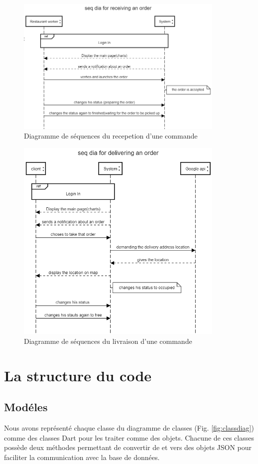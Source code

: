 \documentclass[french, a4paper, 12pt]{report}
\begin{document}
			\newpage	
			\begin{figure}[!h]
  				\center
  				\includegraphics[width=10cm]{seqrest.png}
  				\caption{Diagramme de séquences du recepetion d'une commande}
  				\label{fig:seqrest}
			\end{figure}
			
			\newpage	
			\begin{figure}[!h]
  				\center
  				\includegraphics[width=10cm]{seqdeliver.png}
  				\caption{Diagramme de séquences du livraison d'une commande}
  				\label{fig:seqdeliver}
			\end{figure}
	
	\newpage		
	\section{La structure du code}
		\subsection{Modéles} Nous avons représenté chaque classe du diagramme de classes (Fig. \ref{fig:classdiag}) comme des classes Dart pour les traiter comme des objets. Chacune de ces classes possède deux méthodes permettant de convertir de et vers des objets JSON  pour faciliter la communication avec la base de données.
\end{document}

